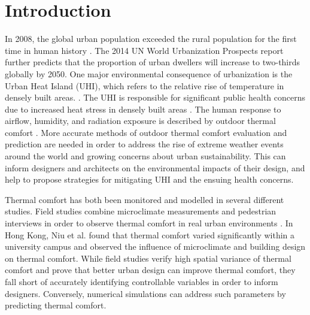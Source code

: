 \documentclass[preprint,3p,12pt,english]{elsarticle}
\begin{document}
\section{Introduction}

In 2008, the global urban population exceeded the rural population for the first time in human history \cite{desa2014world}. The 2014 UN World Urbanization Prospects report further predicts that the proportion of urban dwellers will increase to two-thirds globally by 2050. One major environmental consequence of urbanization is the Urban Heat Island (UHI), which refers to the relative rise of temperature in densely built areas. \cite{kim1992urban, oke1981canyon, oke1973city, bornstein1968observations}. The UHI is responsible for significant public health concerns due to increased heat stress in densely built areas \cite{tan2010urban, lo2003land, mavrogianni2011comfort}. The human response to airflow, humidity, and radiation exposure is described by outdoor thermal comfort \cite{pickup_outdoor_2000}. More accurate methods of outdoor thermal comfort evaluation and prediction are needed in order to address the rise of extreme weather events around the world \cite{katz1992extreme, goswami2006increasing} and growing concerns about urban sustainability. This can inform designers and architects on the environmental impacts of their design, and help to propose strategies for mitigating UHI and the ensuing health concerns.

Thermal comfort has both been monitored and modelled in several different studies. Field studies combine microclimate measurements and pedestrian interviews in order to observe thermal comfort in real urban environments \cite{chow_assessment_2016,lin_thermal_2009,nikolopoulou2001thermal}. In Hong Kong, Niu et al. \cite{niu_new_2015} found that thermal comfort varied significantly within a university campus and observed the influence of microclimate and building design on thermal comfort.  While field studies verify high spatial variance of thermal comfort and prove that better urban design can improve thermal comfort, they fall short of accurately identifying controllable variables in order to inform designers. Conversely, numerical simulations can address such parameters by predicting thermal comfort. 
\end{document}
